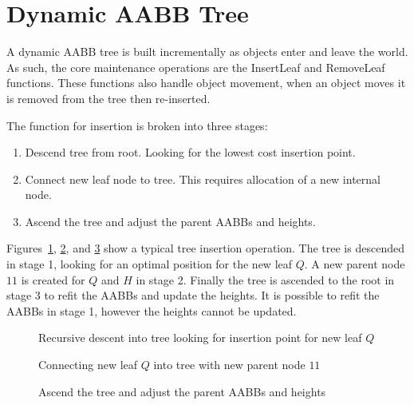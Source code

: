 \documentclass{article}
\begin{document}
\section{Dynamic AABB Tree}
A dynamic AABB tree is built incrementally as objects enter and leave the world. As such, the core maintenance operations are the InsertLeaf and RemoveLeaf functions. These functions also handle object movement, when an object moves it is removed from the tree then re-inserted.

The function for insertion is broken into three stages:
\begin{enumerate}
	\item Descend tree from root. Looking for the lowest cost insertion point.
	\item Connect new leaf node to tree. This requires allocation of a new internal node.
	\item Ascend the tree and adjust the parent AABBs and heights.
\end{enumerate}

Figures~\ref{fig:tree_insert1}, \ref{fig:tree_insert2}, and \ref{fig:tree_insert3} show a typical tree insertion operation. The tree is descended in stage 1, looking for an optimal position for the new leaf $Q$. A new parent node $11$ is created for $Q$ and $H$ in stage 2. Finally the tree is ascended to the root in stage 3 to refit the AABBs and update the heights. It is possible to refit the AABBs in stage 1, however the heights cannot be updated.

\begin{figure}
	\begin{center}
		
	\end{center}
	\caption{Recursive descent into tree looking for insertion point for new leaf $Q$}
	\label{fig:tree_insert1}
\end{figure}

\begin{figure}
	\begin{center}
		
	\end{center}
	\caption{Connecting new leaf $Q$ into tree with new parent node $11$}
	\label{fig:tree_insert2}
\end{figure}


\begin{figure}
	\begin{center}
		
	\end{center}
	\caption{Ascend the tree and adjust the parent AABBs and heights}
	\label{fig:tree_insert3}
\end{figure}
\end{document}
